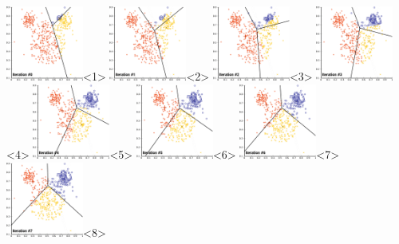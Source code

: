 \documentclass[colorlinks=true,linkcolor=blue]{beamer}
\begin{document}
\begin{frame}
\begin{center}
    \includegraphics[width=1in]{../png/kmeans/kmeans-0.png}<1>%
    \includegraphics[width=1in]{../png/kmeans/kmeans-1.png}<2>%
    \includegraphics[width=1in]{../png/kmeans/kmeans-2.png}<3>%
    \includegraphics[width=1in]{../png/kmeans/kmeans-3.png}<4>%
    \includegraphics[width=1in]{../png/kmeans/kmeans-4.png}<5>%
    \includegraphics[width=1in]{../png/kmeans/kmeans-5.png}<6>%
    \includegraphics[width=1in]{../png/kmeans/kmeans-6.png}<7>%
    \includegraphics[width=1in]{../png/kmeans/kmeans-7.png}<8>%

\end{center}
\end{frame}
\end{document}
